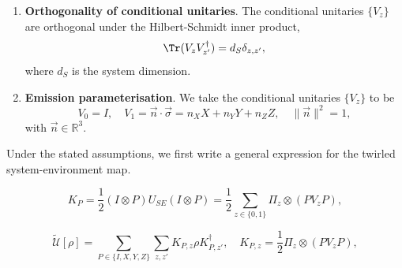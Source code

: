 \begin{enumerate}
    \item[(A5)] \textbf{Orthogonality of conditional unitaries}.
    The conditional unitaries \(\{V_z\}\) are orthogonal under the Hilbert-Schmidt inner product,
    \begin{equation}
        \Tr(V_zV_{z'}^\dagger) = d_S \delta_{z,z'},
    \end{equation}
    where \(d_S\) is the system dimension.
    \item[(A6)] \textbf{Emission parameterisation}. We take the conditional unitaries \(\{V_z\}\) to be
    \begin{equation}
        V_0 = I, \quad V_1 = \vec{n} \cdot \vec{\sigma} = n_X X + n_Y Y + n_Z Z, \quad \|\vec{n}\|^2 = 1,
    \end{equation}
    with \(\vec{n} \in \mathbb{R}^3\).
\end{enumerate}
Under the stated assumptions, we first write a general expression for the twirled system-environment map.

\begin{equation}
    K_P = \frac{1}{2}(I \otimes P) U_{SE} (I \otimes P) = \frac{1}{2}\sum_{z\in\{0,1\}} \Pi_z \otimes (P V_z P),
\end{equation}

\begin{equation}\label{eq:twirled-kraus-ops}
    \widetilde{\mathcal{U}}[\rho] = \sum_{P \in \{I,X,Y,Z\}} \sum_{z,z'} K_{P, z} \rho K_{P, z'}^\dagger, \quad K_{P, z} = \frac{1}{2} \Pi_z \otimes (P V_z P),
\end{equation}


